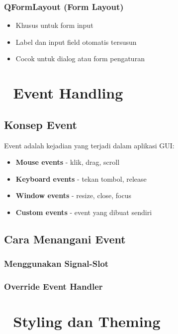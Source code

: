 \subsubsection{QFormLayout (Form Layout)}
\begin{itemize}
\item Khusus untuk form input
\item Label dan input field otomatis tersusun
\item Cocok untuk dialog atau form pengaturan
\end{itemize}

\section{🎯 Event Handling}

\subsection{Konsep Event}

Event adalah kejadian yang terjadi dalam aplikasi GUI:
\begin{itemize}
\item \textbf{Mouse events} - klik, drag, scroll
\item \textbf{Keyboard events} - tekan tombol, release
\item \textbf{Window events} - resize, close, focus
\item \textbf{Custom events} - event yang dibuat sendiri
\end{itemize}

\subsection{Cara Menangani Event}

\subsubsection{Menggunakan Signal-Slot}


\subsubsection{Override Event Handler}


\section{🎨 Styling dan Theming}


